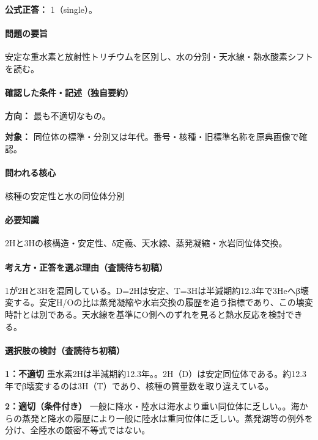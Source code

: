 \textbf{公式正答：} 1（single）。

\paragraph{問題の要旨} 安定な重水素と放射性トリチウムを区別し、水の分別・天水線・熱水酸素シフトを読む。

\paragraph{確認した条件・記述（独自要約）}\mbox{}\par

\noindent\textbf{方向：} 最も不適切なもの。\par

\noindent\textbf{対象：} 同位体の標準・分別又は年代。番号・核種・旧標準名称を原典画像で確認。\par

\paragraph{問われる核心} 核種の安定性と水の同位体分別

\paragraph{必要知識} 2Hと3Hの核構造・安定性、δ定義、天水線、蒸発凝縮・水岩同位体交換。

\paragraph{考え方・正答を選ぶ理由（査読待ち初稿）} 1が2Hと3Hを混同している。D=\allowbreak{}2Hは安定、T=\allowbreak{}3Hは半減期約12.3年で3Heへβ壊変する。安定H/Oの比は蒸発凝縮や水岩交換の履歴を追う指標であり、この壊変時計とは別である。天水線を基準にO側へのずれを見ると熱水反応を検討できる。

\paragraph{選択肢の検討（査読待ち初稿）}\mbox{}\par

\noindent\textbf{1：不適切} 重水素2Hは半減期約12.3年。。2H（D）は安定同位体である。約12.3年でβ壊変するのは3H（T）であり、核種の質量数を取り違えている。\par

\noindent\textbf{2：適切（条件付き）} 一般に降水・陸水は海水より重い同位体に乏しい。。海からの蒸発と降水の履歴により一般に陸水は重同位体に乏しい。蒸発湖等の例外を分け、全陸水の厳密不等式ではない。\par

